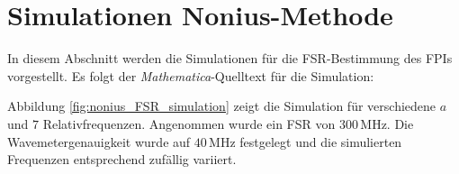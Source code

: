 \section{Simulationen Nonius-Methode}\label{anh:sec:nonius_simulationen}
In diesem Abschnitt werden die Simulationen für die FSR-Bestimmung des FPIs
vorgestellt. Es folgt der \textit{Mathematica}-Quelltext für die Simulation:
\lstset{language=Mathematica}

Abbildung \ref{fig:nonius_FSR_simulation} zeigt die Simulation für verschiedene
$a$ und $7$ Relativfrequenzen. Angenommen wurde ein FSR von $300\,$MHz. Die
Wavemetergenauigkeit wurde auf $40\,$MHz festgelegt und die simulierten
Frequenzen entsprechend zufällig variiert.
\begin{figure}[H]
 	\centering
\end{figure}
